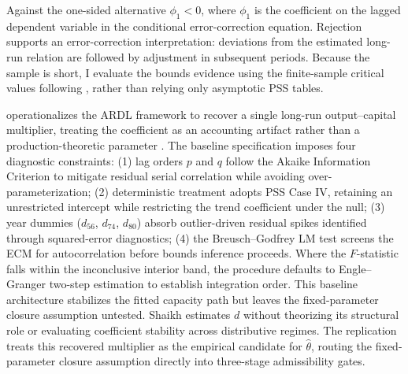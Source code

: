 \documentclass[11pt]{article}
\begin{document}
Against the one-sided alternative $\phi_1<0$, where $\phi_1$ is the coefficient on the lagged dependent variable in the conditional error-correction equation. Rejection supports an error-correction interpretation: deviations from the estimated long-run relation are followed by adjustment in subsequent periods. Because the sample is short, I evaluate the bounds evidence using the finite-sample critical values following \citet{NatsiopoulosTzeremes2022}, rather than relying only asymptotic PSS tables. 


\citet{Shaikh2016} operationalizes the ARDL framework to recover a single long-run output--capital multiplier, treating the coefficient as an accounting artifact rather than a production-theoretic parameter \citep[Appendix~6.7]{Shaikh2016}. The baseline specification imposes four diagnostic constraints: (1) lag orders $p$ and $q$ follow the Akaike Information Criterion to mitigate residual serial correlation while avoiding over-parameterization; (2) deterministic treatment adopts PSS Case IV, retaining an unrestricted intercept while restricting the trend coefficient under the null; (3) year dummies ($d_{56}$, $d_{74}$, $d_{80}$) absorb outlier-driven residual spikes identified through squared-error diagnostics; (4) the Breusch--Godfrey LM test screens the ECM for autocorrelation before bounds inference proceeds. Where the $F$-statistic falls within the inconclusive interior band, the procedure defaults to Engle--Granger two-step estimation to establish integration order. This baseline architecture stabilizes the fitted capacity path but leaves the fixed-parameter closure assumption untested. Shaikh estimates $d$ without theorizing its structural role or evaluating coefficient stability across distributive regimes. The replication treats this recovered multiplier as the empirical candidate for $\hat{\theta}$, routing the fixed-parameter closure assumption directly into three-stage admissibility gates.
\end{document}
